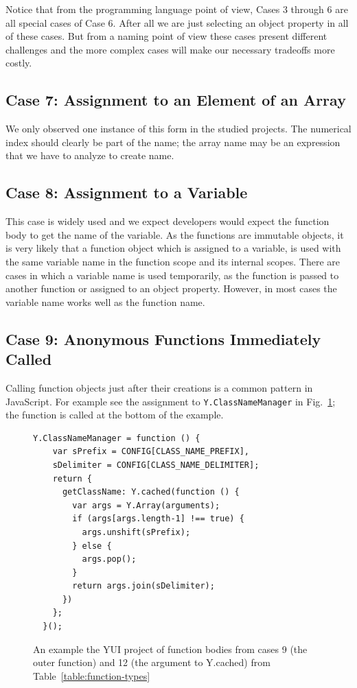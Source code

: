 \documentclass[10pt, preprint]{sigplanconf}
\begin{document}
Notice that from the programming language point of view, Cases 3 through 6 are all special cases of Case 6. After all we are just selecting an object property in all of these cases.  But from a naming point of view these cases present different challenges and the more complex cases will make our necessary tradeoffs more costly.

\subsection{Case 7: Assignment to an Element of an Array}
We only observed one instance of this form in the studied projects. The numerical index should clearly be part of the name; the array name may be an expression that we have to analyze to create name.

\subsection{Case 8: Assignment to a Variable }
This case is widely used and we expect  developers would expect the function body to get the name of the variable.
As the functions are immutable objects, it is very likely that a function object which is assigned to a variable, is used with the same variable name in the function scope
and its internal scopes. There are cases in which a variable name is used temporarily, as the function is passed to another function or assigned to an object property. However, in most cases the variable name works well as the function name. 

\subsection{Case 9: Anonymous Functions Immediately Called}
Calling function objects just after their creations is a common pattern in JavaScript. For example see the assignment to \verb|Y.ClassNameManager| in Fig.~\ref{fig:classnamemanager}; the function is called at the bottom of the example. 
\begin{figure}[htp]
\lstset{basicstyle=\scriptsize}
\begin{lstlisting}[frame=single, language=myLang]
  Y.ClassNameManager = function () {
    var sPrefix = CONFIG[CLASS_NAME_PREFIX],
    sDelimiter = CONFIG[CLASS_NAME_DELIMITER];
    return {
      getClassName: Y.cached(function () {
        var args = Y.Array(arguments);
        if (args[args.length-1] !== true) {
          args.unshift(sPrefix);
        } else {
          args.pop();
        }
        return args.join(sDelimiter);
      })
    };
  }();
\end{lstlisting}
\caption{An example the YUI project of function bodies from cases 9 (the outer function)  and 12  (the argument to Y.cached) from Table~\ref{table:function-types}  }
\label{fig:classnamemanager}
\end{figure}
\end{document}

